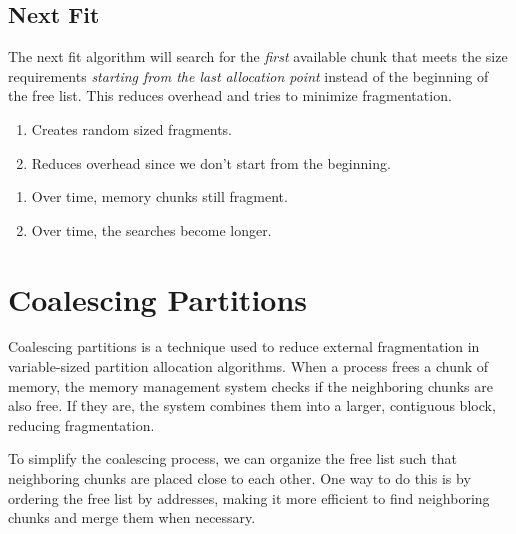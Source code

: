 \documentclass{report}
\newcommand{\bookBegin}[1]{\begin{tcolorbox}[colback=black!5!white,colframe=black!75!black,title={\textit{Operating Systems, Three Easy Pieces: #1}}]}
\newcommand{\bookEnd}{\end{tcolorbox}}
\begin{document}
\subsection{Next Fit}
The next fit algorithm will search for the \textit{first} available chunk that meets the size
requirements \textit{starting from the last allocation point} instead of the beginning of the free
list. This reduces overhead and tries to minimize fragmentation.

\begin{tcbraster}[raster columns=2, raster equal height, raster force size=false]
  \begin{tcolorbox}[colback=green!5!white,colframe=black!75!green,title=Advantages]
    \begin{enumerate}[label=\textit{(\roman*)}]
    \item Creates random sized fragments.
    \item Reduces overhead since we don't start from the beginning.
    \end{enumerate}
  \end{tcolorbox}
  \begin{tcolorbox}[colback=red!5!white,colframe=black!40!red,title=Disadvantages]
    \begin{enumerate}[label=\textit{(\roman*)}]
    \item Over time, memory chunks still fragment.
    \item Over time, the searches become longer.
    \end{enumerate}
  \end{tcolorbox}
\end{tcbraster}





\section{Coalescing Partitions}
Coalescing partitions is a technique used to reduce external fragmentation in variable-sized
partition allocation algorithms. When a process frees a chunk of memory, the memory management
system checks if the neighboring chunks are also free. If they are, the system combines them into a
larger, contiguous block, reducing fragmentation.

\bookBegin{Free-Space Management}
To simplify the coalescing process, we can organize the free list such that neighboring chunks are
placed close to each other. One way to do this is by ordering the free list by addresses, making it
more efficient to find neighboring chunks and merge them when necessary.
\bookEnd
\end{document}
